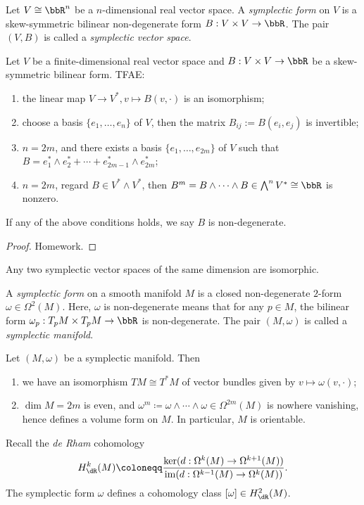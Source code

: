     \begin{definition}
        Let \(V \cong \bbR^n\) be a \(n\)-dimensional real vector space. 
        A \emph{symplectic form} on \(V\) is a skew-symmetric bilinear non-degenerate form \(B: V \times V \to \bbR\).
        The pair \((V, B)\) is called a \emph{symplectic vector space}.
    \end{definition}

    \begin{lemma}
        Let \(V\) be a finite-dimensional real vector space and \(B: V \times V \to \bbR\) be a skew-symmetric bilinear form.
        TFAE:
        \begin{enumerate}[label=(\arabic*)]
            \item the linear map \(V \to V^*, v \mapsto B(v, \cdot)\) is an isomorphism;
            \item choose a basis \(\{e_1, \dots, e_n\}\) of \(V\), then the matrix \(B_{ij} := B(e_i, e_j)\) is invertible;
            \item \(n=2m\), and there exists a basis \(\{e_1, \dots, e_{2m}\}\) of \(V\) such that \(B = e_1^* \wedge e_2^* + \cdots + e_{2m-1}^* \wedge e_{2m}^*\);
            \item \(n=2m\), regard \(B \in V^* \wedge V^*\), then \(B^m = B \wedge \cdots \wedge B \in \bigwedge^{n} V^* \cong \bbR\) is nonzero.
        \end{enumerate}
        If any of the above conditions holds, we say \(B\) is non-degenerate.
    \end{lemma}
    \begin{proof}
        Homework.
    \end{proof}
    \begin{corollary}
        Any two symplectic vector spaces of the same dimension are isomorphic.
    \end{corollary}

    \begin{definition}
        A \emph{symplectic form} on a smooth manifold \(M\) is a closed non-degenerate \(2\)-form \(\omega \in \Omega^2(M)\).
        Here, \(\omega\) is non-degenerate means that for any \(p \in M\), the bilinear form \(\omega_p: T_pM \times T_pM \to \bbR\) is non-degenerate.
        The pair \((M, \omega)\) is called a \emph{symplectic manifold}.
    \end{definition}

    \begin{corollary}
        Let \((M, \omega)\) be a symplectic manifold. 
        Then 
        \begin{enumerate}
            \item we have an isomorphism \(TM \cong T^*M\) of vector bundles given by \(v \mapsto \omega(v, \cdot)\);
            \item \(\dim M = 2m\) is even, and \(\omega^m \coloneqq \omega \wedge \cdots \wedge \omega \in \Omega^{2m}(M)\) is nowhere vanishing, hence defines a volume form on \(M\). 
                In particular, \(M\) is orientable.
        \end{enumerate}
    \end{corollary}

    Recall the \emph{de Rham} cohomology 
    \[ H^k_{\dR}(M) \coloneqq \frac{\ker(d: \Omega^k(M) \to \Omega^{k+1}(M))}{\mathrm{im}(d: \Omega^{k-1}(M) \to \Omega^k(M))}. \]
    The symplectic form \(\omega\) defines a cohomology class \([\omega] \in H^2_{\dR}(M)\).